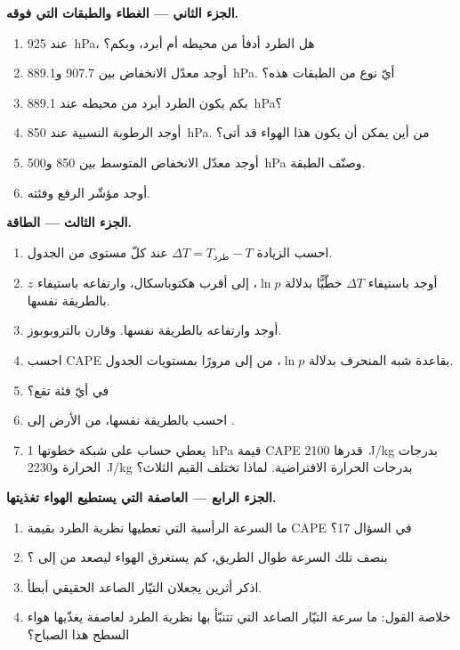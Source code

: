 \begin{problem}
\medskip\noindent\textbf{الجزء الثاني --- الغطاء والطبقات التي فوقه.}
\begin{enumerate}[resume]
  \item عند \qty{925}{hPa}، هل الطرد أدفأ من محيطه أم أبرد، وبكم؟
  \item أوجد معدّل الانخفاض بين 907.7 و\qty{889.1}{hPa}. أيّ نوع من الطبقات هذه؟
  \item بكم يكون الطرد أبرد من محيطه عند \qty{889.1}{hPa}؟
  \item أوجد الرطوبة النسبية عند \qty{850}{hPa}. من أين يمكن أن يكون هذا الهواء قد أتى؟
  \item أوجد معدّل الانخفاض المتوسط بين 850 و\qty{500}{hPa} وصنّف الطبقة.
  \item أوجد مؤشّر الرفع وفئته.
\end{enumerate}

\medskip\noindent\textbf{الجزء الثالث --- الطاقة.}
\begin{enumerate}[resume]
  \item احسب الزيادة $\Delta T = T_{\text{طرد}} - T$ عند كلّ مستوى من الجدول.
  \item أوجد  باستيفاء $\Delta T$ خطّيًّا بدلالة $\ln p$، إلى أقرب هكتوباسكال،
        وارتفاعه باستيفاء $z$ بالطريقة نفسها.
  \item أوجد  وارتفاعه بالطريقة نفسها. وقارن بالتروبوبوز.
  \item احسب CAPE بقاعدة شبه المنحرف بدلالة $\ln p$، من  إلى  مرورًا
        بمستويات الجدول.
  \item في أيّ فئة تقع؟
  \item احسب  بالطريقة نفسها، من الأرض إلى .
  \item يعطي حساب على شبكة خطوتها \qty{1}{hPa} قيمة CAPE قدرها \qty{2100}{J/kg} بدرجات
        الحرارة و\qty{2230}{J/kg} بدرجات الحرارة الافتراضية. لماذا تختلف القيم
        الثلاث؟
\end{enumerate}

\medskip\noindent\textbf{الجزء الرابع --- العاصفة التي يستطيع الهواء تغذيتها.}
\begin{enumerate}[resume]
  \item ما السرعة الرأسية التي تعطيها نظرية الطرد بقيمة CAPE في السؤال 17؟
  \item بنصف تلك السرعة طوال الطريق، كم يستغرق الهواء ليصعد من  إلى ؟
  \item اذكر أثرين يجعلان التيّار الصاعد الحقيقي أبطأ.
  \item خلاصة القول: ما سرعة التيّار الصاعد التي تتنبّأ بها نظرية الطرد لعاصفة يغذّيها
        هواء السطح هذا الصباح؟
\end{enumerate}
\end{problem}
